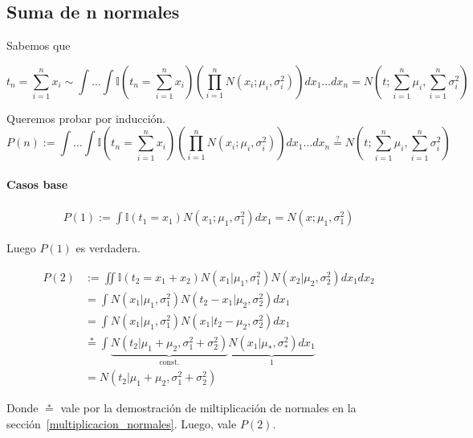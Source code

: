 \documentclass[article]{jss}
\begin{document}
\begin{appendix}
\subsection{Suma de n normales}\label{suma_normales_induccion}

Sabemos que 

\begin{equation}
t_n = \sum_{i=1}^n x_i \sim \int \dots \int \mathbb{I}(t_n= \sum_{i=1}^n x_i ) \left( \prod_{i=1}^n N(x_i;\mu_i,\sigma_i^2) \right) dx_1 \dots dx_n = N(t;\sum_{i=1}^n \mu_i,\sum_{i=1}^n \sigma_i^2 ) 
\end{equation}


Queremos probar por inducci\'on.
\begin{equation}
 P(n):= \int \dots \int \mathbb{I}(t_n= \sum_{i=1}^n x_i ) \left( \prod_{i=1}^n N(x_i;\mu_i,\sigma_i^2) \right) dx_1 \dots dx_n \overset{?}{=} N(t;\sum_{i=1}^n \mu_i,\sum_{i=1}^n \sigma_i^2 )
\end{equation}

\paragraph{Casos base} 

\begin{equation}
\begin{split}
 P(1) := \int \mathbb{I}(t_1 = x_1) N(x_1;\mu_1,\sigma_1^2) dx_1 = N(x;\mu_1,\sigma_1^2)
\end{split}
\end{equation}

Luego $P(1)$ es verdadera.

\begin{equation}
 \begin{split}
P(2) & := \iint \mathbb{I}(t_2 = x_1 + x_2) N(x_1|\mu_1, \sigma_1^2)N(x_2|\mu_2, \sigma_2^2) dx_1dx_2 \\
 &= \int N(x_1|\mu_1, \sigma_1^2) N(t_2 - x_1|\mu_2, \sigma_2^2) dx_1   \\
 & = \int N(x_1|\mu_1, \sigma_1^2) N(x_1|t_2 - \mu_2, \sigma_2^2) dx_1 \\
 & \overset{*}{=} \int \underbrace{N(t_2|\mu_1+\mu_2,\sigma_1^2 + \sigma_2^2)}_{\text{const.}} \underbrace{N(x_1|\mu_{*},\sigma_{*}^2) dx_1}_{1} \\
 & = N(t_2|\mu_1+\mu_2,\sigma_1^2 + \sigma_2^2)
 \end{split}
 \end{equation}
 
 Donde $\overset{*}{=}$ vale por la demostraci\'on de miltiplicaci\'on de normales en la secci\'on~\ref{multiplicacion_normales}. 
 Luego, vale $P(2)$.


\end{appendix}
\end{document}
